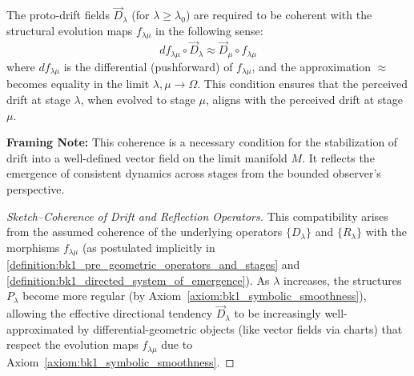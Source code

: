 \begin{lemma}
\label{lemma:bk1_coherence_of_proto_drift_fields}
The proto-drift fields $\vec{D}_\lambda$ (for $\lambda \ge \lambda_0$) are required to be coherent with the structural evolution maps $f_{\lambda\mu}$ in the following sense:
\[
df_{\lambda\mu} \circ \vec{D}_\lambda \approx \vec{D}_\mu \circ f_{\lambda\mu}
\]
where $df_{\lambda\mu}$ is the differential (pushforward) of $f_{\lambda\mu}$, and the approximation $\approx$ becomes equality in the limit $\lambda, \mu \to \Omega$. This condition ensures that the perceived drift at stage $\lambda$, when evolved to stage $\mu$, aligns with the perceived drift at stage $\mu$.

\smallskip
\noindent
\textbf{Framing Note:} This coherence is a necessary condition for the stabilization of drift into a well-defined vector field on the limit manifold $M$. It reflects the emergence of consistent dynamics across stages from the bounded observer's perspective.

\begin{proof}[Sketch–Coherence of Drift and Reflection Operators]
\label{proof:bk1_sketch_coherence_drift_reflection}
This compatibility arises from the assumed coherence of the underlying operators $\{D_\lambda\}$ and $\{R_\lambda\}$ with the morphisms $f_{\lambda\mu}$ (as postulated implicitly in \ref{definition:bk1_pre_geometric_operators_and_stages} and \ref{definition:bk1_directed_system_of_emergence}). As $\lambda$ increases, the structures $P_\lambda$ become more regular (by Axiom~\ref{axiom:bk1_symbolic_smoothness}), allowing the effective directional tendency $\vec{D}_\lambda$ to be increasingly well-approximated by differential-geometric objects (like vector fields via charts) that respect the evolution maps $f_{\lambda\mu}$ due to Axiom~\ref{axiom:bk1_symbolic_smoothness}.
\end{proof}
\end{lemma}

